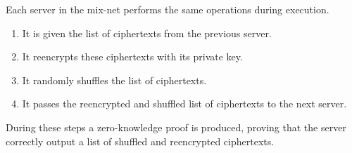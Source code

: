 
Each server in the mix-net performs the same operations during execution.

\begin{enumerate}
\item It is given the list of ciphertexts from the previous server.
\item It reencrypts these ciphertexts with its private key.
\item It randomly shuffles the list of ciphertexts.
\item It passes the reencrypted and shuffled list of ciphertexts to the next server.
\end{enumerate}

During these steps a zero-knowledge proof is produced, proving that
the server correctly output a list of shuffled and reencrypted
ciphertexts.

\begin{center}
\end{center}
